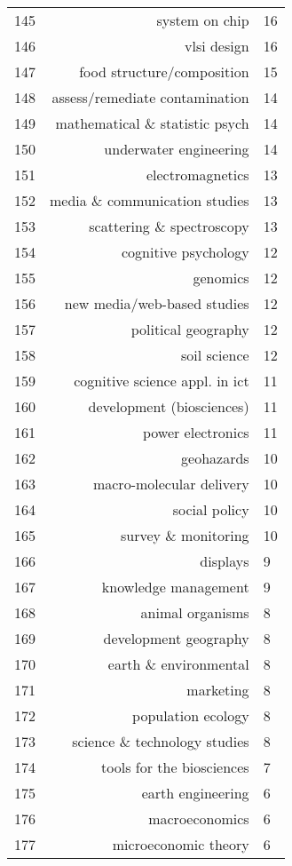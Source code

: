 \begin{spacing}{0.9}
\begin{longtable}[c]{r|r|>{\raggedleft\arraybackslash}m{2.3cm}}
{145} & {system on chip} & {16}\\
{146} & {vlsi design} & {16}\\
{147} & {food structure/composition} & {15}\\
{148} & {assess/remediate contamination} & {14}\\
{149} & {mathematical \& statistic psych} & {14}\\
{150} & {underwater engineering} & {14}\\
{151} & {electromagnetics} & {13}\\
{152} & {media \& communication studies} & {13}\\
{153} & {scattering \& spectroscopy} & {13}\\
{154} & {cognitive psychology} & {12}\\
{155} & {genomics} & {12}\\
{156} & {new media/web-based studies} & {12}\\
{157} & {political geography} & {12}\\
{158} & {soil science} & {12}\\
{159} & {cognitive science appl. in ict} & {11}\\
{160} & {development (biosciences)} & {11}\\
{161} & {power electronics} & {11}\\
{162} & {geohazards} & {10}\\
{163} & {macro-molecular delivery} & {10}\\
{164} & {social policy} & {10}\\
{165} & {survey \& monitoring} & {10}\\
{166} & {displays} & {9}\\
{167} & {knowledge management} & {9}\\
{168} & {animal organisms} & {8}\\
{169} & {development geography} & {8}\\
{170} & {earth \& environmental} & {8}\\
{171} & {marketing} & {8}\\
{172} & {population ecology} & {8}\\
{173} & {science \& technology studies} & {8}\\
{174} & {tools for the biosciences} & {7}\\
{175} & {earth engineering} & {6}\\
{176} & {macroeconomics} & {6}\\
{177} & {microeconomic theory} & {6}\\

\end{longtable}
\end{spacing}
